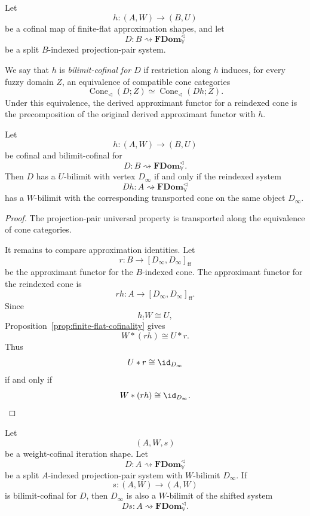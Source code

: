 \begin{definition}
\label{def:bilimit-cofinal-reindexing}
Let
\[
    h:(A,W)\to(B,U)
\]
be a cofinal map of finite-flat approximation shapes, and let
\[
    D:B\rightsquigarrow\mathbf{FDom}_{\mathbb V}^{\triangleleft}
\]
be a split \(B\)-indexed projection-pair system.

We say that \(h\) is \emph{bilimit-cofinal for \(D\)} if restriction along
\(h\) induces, for every fuzzy domain \(Z\), an equivalence of compatible cone
categories
\[
    \operatorname{Cone}_{\triangleleft}(D;Z)
    \simeq
    \operatorname{Cone}_{\triangleleft}(Dh;Z).
\]
Under this equivalence, the derived approximant functor for a reindexed cone is
the precomposition of the original derived approximant functor with \(h\).
\end{definition}

\begin{lemma}
\label{lem:cofinal-reindexing-W-bilimits}
Let
\[
    h:(A,W)\to(B,U)
\]
be cofinal and bilimit-cofinal for
\[
    D:B\rightsquigarrow\mathbf{FDom}_{\mathbb V}^{\triangleleft}.
\]
Then \(D\) has a \(U\)-bilimit with vertex \(D_\infty\) if and only if the
reindexed system
\[
    Dh:A\rightsquigarrow\mathbf{FDom}_{\mathbb V}^{\triangleleft}
\]
has a \(W\)-bilimit with the corresponding transported cone on the same object
\(D_\infty\).
\end{lemma}

\begin{proof}
The projection-pair universal property is transported along the equivalence of
cone categories.

It remains to compare approximation identities.  Let
\[
    r:B\to[D_\infty,D_\infty]_{\mathrm{ff}}
\]
be the approximant functor for the \(B\)-indexed cone.  The approximant functor
for the reindexed cone is
\[
    rh:A\to[D_\infty,D_\infty]_{\mathrm{ff}}.
\]
Since
\[
    h_!W\cong U,
\]
Proposition~\ref{prop:finite-flat-cofinality} gives
\[
    W*(rh)
    \cong
    U*r.
\]
Thus
\[
    U*r\cong\id_{D_\infty}
\]
if and only if
\[
    W*(rh)\cong\id_{D_\infty}.
\]
\end{proof}

\begin{theorem}
\label{thm:shifted-bilimits-ff}
Let
\[
    (A,W,s)
\]
be a weight-cofinal iteration shape.  Let
\[
    D:A\rightsquigarrow\mathbf{FDom}_{\mathbb V}^{\triangleleft}
\]
be a split \(A\)-indexed projection-pair system with \(W\)-bilimit
\(D_\infty\).  If
\[
    s:(A,W)\to(A,W)
\]
is bilimit-cofinal for \(D\), then \(D_\infty\) is also a \(W\)-bilimit of the
shifted system
\[
    Ds:A\rightsquigarrow\mathbf{FDom}_{\mathbb V}^{\triangleleft}.
\]
\end{theorem}

